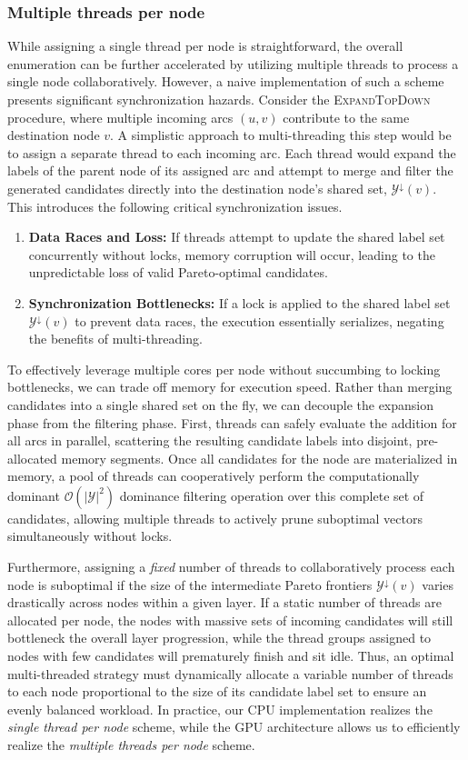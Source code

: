 \documentclass[letterpaper]{article}
\begin{document}
\subsubsection{Multiple threads per node}
While assigning a single thread per node is straightforward, the overall enumeration can be further accelerated by utilizing multiple threads to process a single node collaboratively. However, a naive implementation of such a scheme presents significant synchronization hazards.
Consider the \textsc{ExpandTopDown} procedure, where multiple incoming arcs $(u,v)$ contribute to the same destination node $v$. A simplistic approach to multi-threading this step would be to assign a separate thread to each incoming arc. Each thread would expand the labels of the parent node of its assigned arc and attempt to merge and filter the generated candidates directly into the destination node's shared set, $\mathcal{Y}^{\downarrow}(v)$. This introduces the following critical synchronization issues.
\begin{enumerate}
\item \textbf{Data Races and Loss:} If threads attempt to update the shared label set concurrently without locks, memory corruption will occur, leading to the unpredictable loss of valid Pareto-optimal candidates.
\item \textbf{Synchronization Bottlenecks:} If a lock is applied to the shared label set $\mathcal{Y}^{\downarrow}(v)$ to prevent data races, the execution essentially serializes, negating the benefits of multi-threading.
\end{enumerate}
To effectively leverage multiple cores per node without succumbing to locking bottlenecks, we can trade off memory for execution speed. Rather than merging candidates into a single shared set on the fly, we can decouple the expansion phase from the filtering phase. First, threads can safely evaluate the addition for all arcs in parallel, scattering the resulting candidate labels into disjoint, pre-allocated memory segments. Once all candidates for the node are materialized in memory, a pool of threads can cooperatively perform the computationally dominant $\mathcal{O}(|\mathcal{Y}|^2)$ dominance filtering operation over this complete set of candidates, allowing multiple threads to actively prune suboptimal vectors simultaneously without locks.

Furthermore, assigning a \textit{fixed} number of threads to collaboratively process each node is suboptimal if the size of the intermediate Pareto frontiers $\mathcal{Y}^{\downarrow}(v)$ varies drastically across nodes within a given layer. If a static number of threads are allocated per node, the nodes with massive sets of incoming candidates will still bottleneck the overall layer progression, while the thread groups assigned to nodes with few candidates will prematurely finish and sit idle. Thus, an optimal multi-threaded strategy must dynamically allocate a variable number of threads to each node proportional to the size of its candidate label set to ensure an evenly balanced workload.
In practice, our CPU implementation realizes the \textit{single thread per node} scheme, while the GPU architecture allows us to efficiently realize the \textit{multiple threads per node} scheme.
\end{document}
